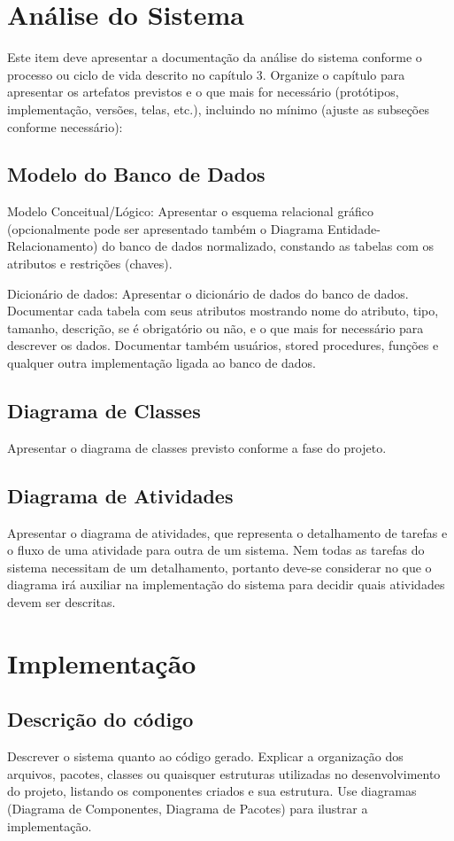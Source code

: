 \documentclass[a4paper,12pt]{article}
\begin{document}
\newpage
\section{Análise do Sistema}
Este item deve apresentar a documentação da análise do sistema conforme o processo ou ciclo de vida descrito no capítulo 3. Organize o capítulo para apresentar os artefatos previstos e o que mais for necessário (protótipos, implementação, versões, telas, etc.), incluindo no mínimo (ajuste as subseções conforme necessário):

\subsection{Modelo do Banco de Dados}
Modelo Conceitual/Lógico: Apresentar o esquema relacional gráfico (opcionalmente pode ser apresentado também o Diagrama Entidade-Relacionamento) do banco de dados normalizado, constando as tabelas com os atributos e restrições (chaves).

Dicionário de dados: Apresentar o dicionário de dados do banco de dados. Documentar cada tabela com seus atributos mostrando nome do atributo, tipo, tamanho, descrição, se é obrigatório ou não, e o que mais for necessário para descrever os dados. Documentar também usuários, stored procedures, funções e qualquer outra implementação ligada ao banco de dados.

\subsection{Diagrama de Classes}
Apresentar o diagrama de classes previsto conforme a fase do projeto.

\subsection{Diagrama de Atividades}
Apresentar o diagrama de atividades, que representa o detalhamento de tarefas e o fluxo de uma atividade para outra de um sistema. Nem todas as tarefas do sistema necessitam de um detalhamento, portanto deve-se considerar no que o diagrama irá auxiliar na implementação do sistema para decidir quais atividades devem ser descritas.

\newpage
\section{Implementação}
\subsection{Descrição do código}
Descrever o sistema quanto ao código gerado. Explicar a organização dos arquivos, pacotes, classes ou quaisquer estruturas utilizadas no desenvolvimento do projeto, listando os componentes criados e sua estrutura. Use diagramas (Diagrama de Componentes, Diagrama de Pacotes) para ilustrar a implementação.
\end{document}
